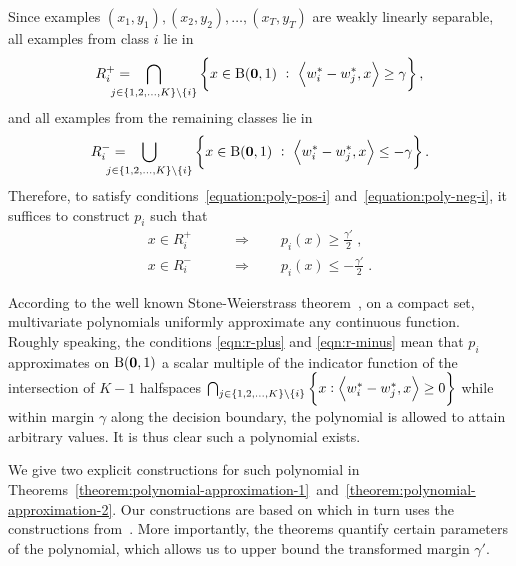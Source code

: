 Since examples $(x_1,y_1), (x_2, y_2), \dots, (x_T,y_T)$ are weakly linearly separable,
all examples from class $i$ lie in
$$
R_i^+ = \!\!\!\!\! \!\!\!\!\! \bigcap_{j \in \cbr{1,2,\dots,K} \setminus \cbr{i}} \cbr{x \in \B(\zero,1) ~:~ \ip{w_i^* - w_j^*}{x} \ge \gamma},
$$
and all examples from the remaining classes lie in
$$
R_i^- = \!\!\!\!\! \!\!\!\!\! \bigcup_{j \in \cbr{1,2,\dots,K} \setminus \cbr{i}} \cbr{x \in \B(\zero,1) ~:~ \ip{w_i^* - w_j^*}{x} \le -\gamma}.
$$
Therefore, to satisfy conditions~\eqref{equation:poly-pos-i}
and~\eqref{equation:poly-neg-i}, it suffices to construct $p_i$ such that
\begin{align}
\label{eqn:r-plus}
x \in R_i^+ \qquad & \Longrightarrow \qquad p_i(x) \ge \frac {\gamma'} 2 \; , \\
\label{eqn:r-minus}
x \in R_i^- \qquad & \Longrightarrow \qquad p_i(x) \le - \frac {\gamma'} 2 \; .
\end{align}

According to the well known Stone-Weierstrass theorem~\citep[see
e.g.][Section~10.10]{Davidson-Donsig-2010}, on a compact set, multivariate
polynomials uniformly approximate any continuous function. Roughly speaking, the
conditions \eqref{eqn:r-plus} and \eqref{eqn:r-minus} mean that $p_i$
approximates on $\operatorname{B}(\mathbf{0},1)$ a scalar multiple of the indicator function of the
intersection of $K-1$ halfspaces $\bigcap_{j \in \cbr{1,2,\dots,K} \setminus
\cbr{i}} \cbr{x: \ip{w_i^* - w_j^*}{x} \geq 0}$ while within margin $\gamma$ along
the decision boundary, the polynomial is allowed to attain arbitrary values.
It is thus clear such a polynomial exists.

We give two explicit constructions for such polynomial in
Theorems~\ref{theorem:polynomial-approximation-1}~and~\ref{theorem:polynomial-approximation-2}.
Our constructions are based on \citet{Klivans-Servedio-2008} which in turn uses
the constructions from~\citet{Beigel-Reingold-Spielman-1995}. More importantly,
the theorems quantify certain parameters of the polynomial, which allows us
to upper bound the transformed margin $\gamma'$.

